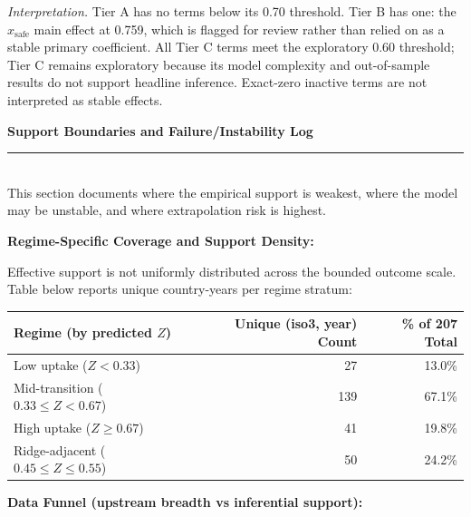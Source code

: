 \documentclass[11pt]{article}
\newcommand{\SubRule}{\color{black}\rule{\linewidth}{0.4pt}}
\newcommand{\Section}[1]{\noindent\textbf{#1}\\[-0.25em]\SubRule\\[0.1em]}
\begin{document}
\vspace{0.2em}

\noindent\textit{Interpretation.} Tier A has no terms below its 0.70 threshold. Tier B has one: the $x_{\text{safe}}$ main effect at 0.759, which is flagged for review rather than relied on as a stable primary coefficient. All Tier C terms meet the exploratory 0.60 threshold; Tier C remains exploratory because its model complexity and out-of-sample results do not support headline inference. Exact-zero inactive terms are not interpreted as stable effects.

\Section{Support Boundaries and Failure/Instability Log}

This section documents where the empirical support is weakest, where the model may be unstable, and where extrapolation risk is highest.

{\small\textbf{Regime-Specific Coverage and Support Density:}}

\noindent Effective support is not uniformly distributed across the bounded outcome scale. Table below reports unique country-years per regime stratum:

\begin{center}
{\footnotesize
\begin{tabularx}{0.8\linewidth}{@{}lrr@{}}
\toprule
Regime (by predicted $Z$) & Unique (iso3, year) Count & \% of 207 Total \\
\midrule
Low uptake ($Z < 0.33$) & 27 & 13.0\% \\
Mid-transition ($0.33 \le Z < 0.67$) & 139 & 67.1\% \\
High uptake ($Z \ge 0.67$) & 41 & 19.8\% \\
Ridge-adjacent ($0.45 \le Z \le 0.55$) & 50 & 24.2\% \\
\bottomrule
\end{tabularx}
}
\end{center}

{\small\textbf{Data Funnel (upstream breadth vs inferential support):}}
\end{document}
